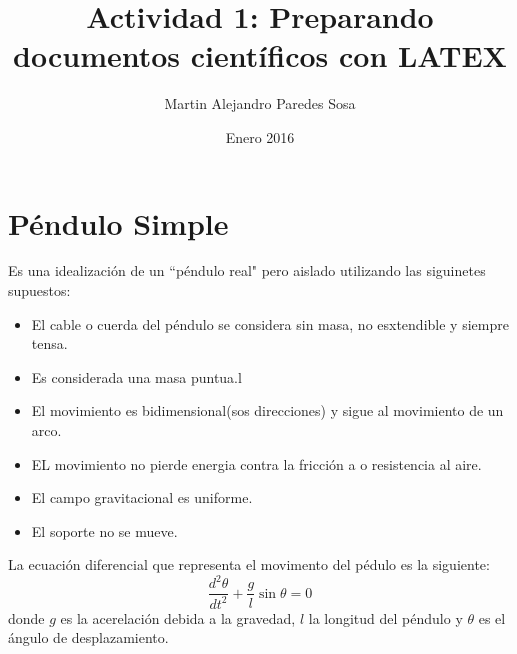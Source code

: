 \documentclass[12pt]{article}
\begin{document}
\title{Actividad 1: Preparando documentos científicos con LATEX}
\author{Martin Alejandro Paredes Sosa}
\date{Enero 2016}
\maketitle

\section{Péndulo Simple}
Es una idealización de un ``péndulo real" pero aislado utilizando las siguinetes supuestos:
\begin{itemize}
\item El cable o cuerda del péndulo se considera sin masa, no esxtendible y siempre tensa.
\item Es considerada una masa puntua.l %
\item El movimiento es bidimensional(sos direcciones) y sigue al movimiento de un arco.
\item EL movimiento no pierde energia contra la fricción a o resistencia al aire.
\item El campo gravitacional es uniforme.
\item El soporte no se mueve.
\end{itemize}

La ecuación diferencial que representa el movimento del pédulo es la siguiente:
\begin{equation}
\frac{d^2\theta}{dt^2}+\frac{g}{l}\sin\theta=0
\end{equation}
donde $g$ es la acerelación debida a la gravedad, $l$ la longitud del péndulo y $\theta$ es el ángulo de desplazamiento.

\end{document}
